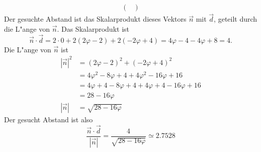 \begin{loesung}
\begin{align*}
\begin{pmatrix}
\end{pmatrix}
\end{align*}
Der gesuchte Abstand ist das Skalarprodukt dieses Vektors $\vec n$
mit $\vec d$, geteilt durch die L"ange von $\vec n$. Das Skalarprodukt
ist
\[
\vec n\cdot\vec d=2\cdot 0+2(2\varphi-2)+2(-2\varphi+4)
=4\varphi-4-4\varphi+8=4.
\]
Die L"ange von $\vec n$ ist
\begin{align*}
|\vec n|^2&=(2\varphi-2)^2+(-2\varphi+4)^2\\
&=4 \varphi^2-8\varphi+4+4\varphi^2-16\varphi+16\\
&=4\varphi+4-8\varphi+4+4\varphi+4-16\varphi+16\\
&=28-16\varphi\\
|\vec n|&=\sqrt{28-16\varphi}
\end{align*}
Der gesucht Abstand ist also
\[
\frac{\vec n\cdot \vec d}{|\vec n|}=\frac{4}{\sqrt{28-16\varphi}}\simeq
2.7528
\]
\end{loesung}

